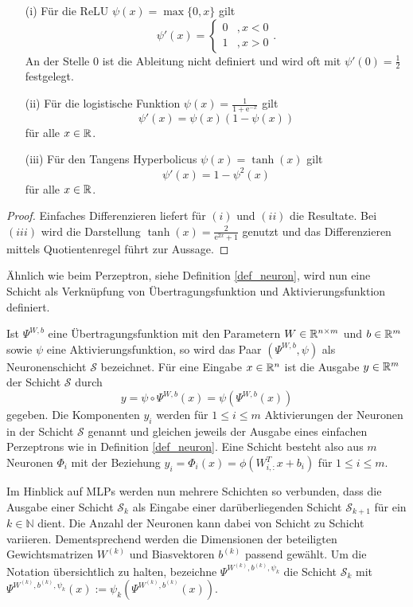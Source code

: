 \begin{lem}
    \begin{itemize}
        \item[(i)] Für die ReLU $\psi(x)=\max\{0,x\}$ gilt
         \[\psi'(x)=\begin{cases}
            0 &, x <0 \\
            1 &, x >0
        \end{cases}. 
        \]
        An der Stelle 0 ist die Ableitung nicht definiert und wird oft mit $\psi'(0)=\frac{1}{2}$ festgelegt.
        \item[(ii)] Für die logistische Funktion $\psi(x)=\frac{1}{1+\mathrm{e}^{-x}}$ gilt
        \[ 
            \psi'(x)=\psi(x)(1-\psi(x)) 
        \]
        für alle $x \in \mathbb{R}$.
        \item[(iii)] Für den Tangens Hyperbolicus $\psi(x)=\tanh(x)$ gilt
        \[ 
            \psi'(x)=1-\psi^2(x) 
        \]
        für alle $x \in \mathbb{R}$.
    \end{itemize}
\end{lem}
\begin{proof}
    Einfaches Differenzieren liefert für $(i)$ und $(ii)$ die Resultate. Bei $(iii)$ wird die Darstellung $\tanh(x)=\frac{2}{\mathrm{e}^{2x}+1}$ genutzt und das Differenzieren mittels Quotientenregel führt zur Aussage.
\end{proof}

Ähnlich wie beim Perzeptron, siehe Definition \ref{def_neuron}, wird nun eine Schicht als Verknüpfung von Übertragungsfunktion und Aktivierungsfunktion definiert.

\begin{defi}[Neuronenschicht]
    \label{def:NNlayer}
    Ist $\Psi^{W,b}$ eine Übertragungsfunktion mit den Parametern $W \in \mathbb{R}^{n \times m}$ und $b \in \mathbb{R}^m$ sowie $\psi$ eine Aktivierungsfunktion, so wird das Paar $(\Psi^{W,b}, \psi)$ als Neuronenschicht $\mathcal{S}$ bezeichnet. Für eine Eingabe $x \in \mathbb{R}^n$ ist die Ausgabe $y \in \mathbb{R}^m$ der Schicht $\mathcal{S}$ durch
    \[y=\psi \circ \Psi^{W,b}(x)= \psi\left(\Psi^{W,b}(x)\right)
        \] 
        gegeben. Die Komponenten $y_i$ werden für $1 \leq i \leq m$ Aktivierungen der Neuronen in der Schicht $\mathcal{S}$ genannt und gleichen jeweils der Ausgabe eines einfachen Perzeptrons wie in Definition \ref{def_neuron}. Eine Schicht besteht also aus $m$ Neuronen $\Phi_i$ mit der Beziehung $y_i=\Phi_i(x)=\phi(W_{i,:}^T x+b_i)$ für $1 \leq i \leq m$.
\end{defi}
Im Hinblick auf MLPs werden nun mehrere Schichten so verbunden, dass die Ausgabe einer Schicht $\mathcal{S}_k$ als Eingabe einer darüberliegenden Schicht $\mathcal{S}_{k+1}$ für ein $k \in \mathbb{N}$ dient. Die Anzahl der Neuronen kann dabei von Schicht zu Schicht variieren. Dementsprechend werden die Dimensionen der beteiligten Gewichtsmatrizen $W^{(k)}$ und Biasvektoren $b^{(k)}$ passend gewählt. 
Um die Notation übersichtlich zu halten, bezeichne $\Psi^{W^{(k)},b^{(k)},\psi_{k}}$ die Schicht $\mathcal{S}_k$ mit $\Psi^{W^{(k)},b^{(k)},\psi_{k}}(x):= \psi_{k} \left(\Psi^{W^{(k)},b^{(k)}}(x)\right)$.

